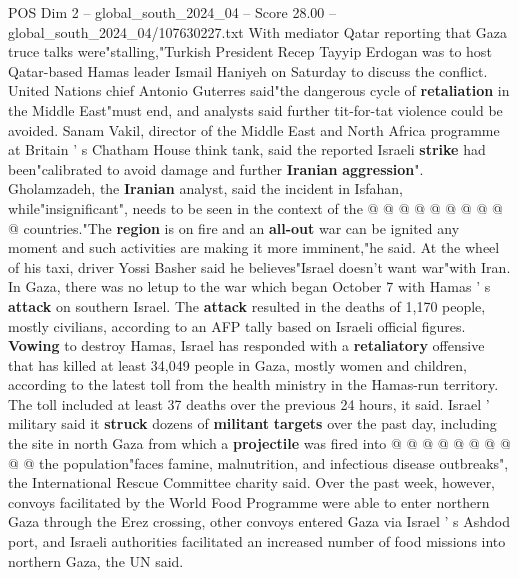 \begin{textsample}{POS Dim 2 – global\_south\_2024\_04 – Score 28.00 – global\_south\_2024\_04/107630227.txt}
With mediator Qatar reporting that Gaza truce talks were"stalling,"Turkish President Recep Tayyip Erdogan was to host Qatar-based Hamas leader Ismail Haniyeh on Saturday to discuss the conflict.
United Nations chief Antonio Guterres said"the dangerous cycle of \textbf{retaliation} in the Middle East"must end, and analysts said further tit-for-tat violence could be avoided.
Sanam Vakil, director of the Middle East and North Africa programme at Britain ' s Chatham House think tank, said the reported Israeli \textbf{strike} had been"calibrated to avoid damage and further \textbf{Iranian} \textbf{aggression}".
Gholamzadeh, the \textbf{Iranian} analyst, said the incident in Isfahan, while"insignificant", needs to be seen in the context of the @ @ @ @ @ @ @ @ @ @ countries."The \textbf{region} is on fire and an \textbf{all-out} war can be ignited any moment and such activities are making it more imminent,"he said.
At the wheel of his taxi, driver Yossi Basher said he believes"Israel doesn't want war"with Iran.
In Gaza, there was no letup to the war which began October 7 with Hamas ' s \textbf{attack} on southern Israel.
The \textbf{attack} resulted in the deaths of 1,170 people, mostly civilians, according to an AFP tally based on Israeli official figures. \textbf{Vowing} to destroy Hamas, Israel has responded with a \textbf{retaliatory} offensive that has killed at least 34,049 people in Gaza, mostly women and children, according to the latest toll from the health ministry in the Hamas-run territory.
The toll included at least 37 deaths over the previous 24 hours, it said.
Israel ' military said it \textbf{struck} dozens of \textbf{militant} \textbf{targets} over the past day, including the site in north Gaza from which a \textbf{projectile} was fired into @ @ @ @ @ @ @ @ @ @ the population"faces famine, malnutrition, and infectious disease outbreaks", the International Rescue Committee charity said.
Over the past week, however, convoys facilitated by the World Food Programme were able to enter northern Gaza through the Erez crossing, other convoys entered Gaza via Israel ' s Ashdod port, and Israeli authorities facilitated an increased number of food missions into northern Gaza, the UN said.

\end{textsample}
